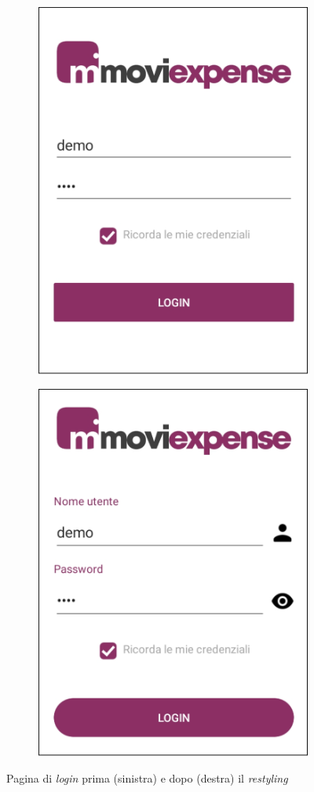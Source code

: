 \begin{figure}[H]
    \begin{subfigure}{.5\textwidth}
        \centering
        \includegraphics[width=.7\columnwidth]{images/screenshot/old/login.png}\vspace{2mm}
    \end{subfigure}
    \begin{subfigure}{.5\textwidth}
        \centering
        \includegraphics[width=.7\columnwidth]{images/screenshot/new/login.png}\vspace{2mm}
    \end{subfigure}
    \caption{Pagina di \textit{login} prima (sinistra) e dopo (destra) il \textit{restyling}}
\end{figure}

